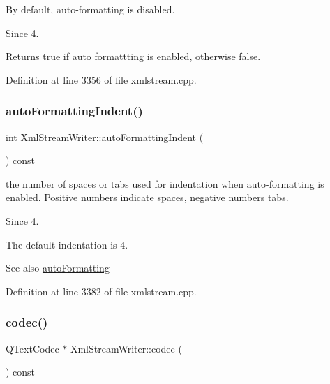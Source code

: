 By default, auto-\/formatting is disabled.

\begin{DoxySince}{Since}
4.
\end{DoxySince}
Returns {\ttfamily true} if auto formattting is enabled, otherwise {\ttfamily false}. 

Definition at line 3356 of file xmlstream.\+cpp.

\mbox{\label{class_xml_stream_writer_a322ab2c9f7ec4d33ef0fb55cfbdd9d7d}} 
\subsubsection{\texorpdfstring{auto\+Formatting\+Indent()}{autoFormattingIndent()}}
{\footnotesize\ttfamily int Xml\+Stream\+Writer\+::auto\+Formatting\+Indent (\begin{DoxyParamCaption}{ }\end{DoxyParamCaption}) const}



the number of spaces or tabs used for indentation when auto-\/formatting is enabled. Positive numbers indicate spaces, negative numbers tabs. 

\begin{DoxySince}{Since}
4.
\end{DoxySince}
The default indentation is 4.

\begin{DoxySeeAlso}{See also}
\hyperlink{class_xml_stream_writer_a257ecf97cf02f3ca8cb86c2ecf425a8c}{auto\+Formatting} 
\end{DoxySeeAlso}


Definition at line 3382 of file xmlstream.\+cpp.

\mbox{\label{class_xml_stream_writer_a08d4e9eddc07ed3682ced34cce8861f9}} 
\subsubsection{\texorpdfstring{codec()}{codec()}}
{\footnotesize\ttfamily Q\+Text\+Codec $\ast$ Xml\+Stream\+Writer\+::codec (\begin{DoxyParamCaption}{ }\end{DoxyParamCaption}) const}

